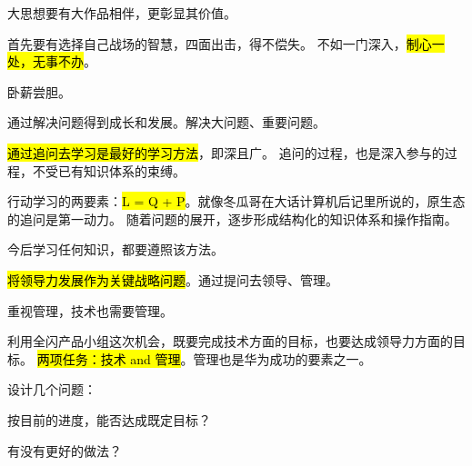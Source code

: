 大思想要有大作品相伴，更彰显其价值。

首先要有选择自己战场的智慧，四面出击，得不偿失。
不如一门深入，\hl{制心一处，无事不办}。

卧薪尝胆。

通过解决问题得到成长和发展。解决大问题、重要问题。

\hl{通过追问去学习是最好的学习方法}，即深且广。
追问的过程，也是深入参与的过程，不受已有知识体系的束缚。

行动学习的两要素：\hl{L = Q + P}。就像冬瓜哥在大话计算机后记里所说的，原生态的追问是第一动力。
随着问题的展开，逐步形成结构化的知识体系和操作指南。

今后学习任何知识，都要遵照该方法。

\hrulefill

\hl{将领导力发展作为关键战略问题}。通过提问去领导、管理。

重视管理，技术也需要管理。

利用全闪产品小组这次机会，既要完成技术方面的目标，也要达成领导力方面的目标。
\hl{两项任务：技术 and 管理}。管理也是华为成功的要素之一。

设计几个问题：
\begin{enumbox}
\item 按目前的进度，能否达成既定目标？
\item 有没有更好的做法？
\end{enumbox}
